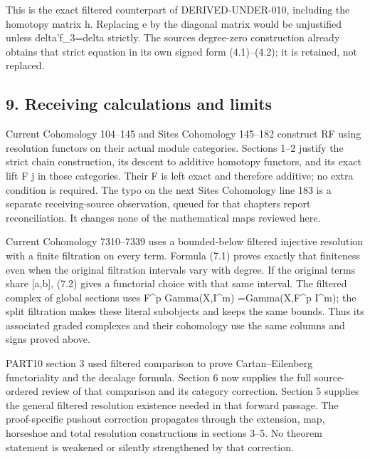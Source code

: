 \documentclass[11pt]{article}
\begin{document}
This is the exact filtered counterpart of DERIVED-UNDER-010,\allowbreak{} including the homotopy matrix h. Replacing e by the diagonal matrix would be unjustified unless delta'f\_\allowbreak{}3\allowbreak{}=delta strictly. The source\textquotesingle s degree-zero construction already obtains that strict equation in its own signed form (4.1)\allowbreak{}–\allowbreak{}(4.2)\allowbreak{}; it is retained,\allowbreak{} not replaced.

\subsection{9. Receiving calculations and limits}\label{proofs-7589-8350-receiving-calculations-and-limits}

Current Cohomology 104–\allowbreak{}145 and Sites Cohomology 145–\allowbreak{}182 construct RF using resolution functors on their actual module categories. Sections 1–\allowbreak{}2 justify the strict chain construction,\allowbreak{} its descent to additive homotopy functors,\allowbreak{} and its exact lift F j\textquotesingle{} in those categories. Their F is left exact and therefore additive; no extra condition is required. The typo on the next Sites Cohomology line 183 is a separate receiving-source observation,\allowbreak{} queued for that chapter\textquotesingle s report reconciliation. It changes none of the mathematical maps reviewed here.

Current Cohomology 7310–\allowbreak{}7339 uses a bounded-below filtered injective resolution with a finite filtration on every term. Formula (7.1)\allowbreak{} proves exactly that finiteness even when the original filtration intervals vary with degree. If the original terms share [a,\allowbreak{}b]\allowbreak{},\allowbreak{} (7.2)\allowbreak{} gives a functorial choice with that same interval. The filtered complex of global sections uses F\^{}p Gamma(X,\allowbreak{}I\textasciicircum{}m)\allowbreak{} \allowbreak{}=Gamma(X,\allowbreak{}F\textasciicircum{}p I\textasciicircum{}m)\allowbreak{}; the split filtration makes these literal subobjects and keeps the same bounds. Thus its associated graded complexes and their cohomology use the same columns and signs proved above.

PART10 section 3 used filtered comparison to prove Cartan–\allowbreak{}Eilenberg functoriality and the decalage formula. Section 6 now supplies the full source-ordered review of that comparison and its category correction. Section 5 supplies the general filtered resolution existence needed in that forward passage. The proof-specific pushout correction propagates through the extension,\allowbreak{} map,\allowbreak{} horseshoe and total resolution constructions in sections 3–\allowbreak{}5. No theorem statement is weakened or silently strengthened by that correction.
\end{document}
